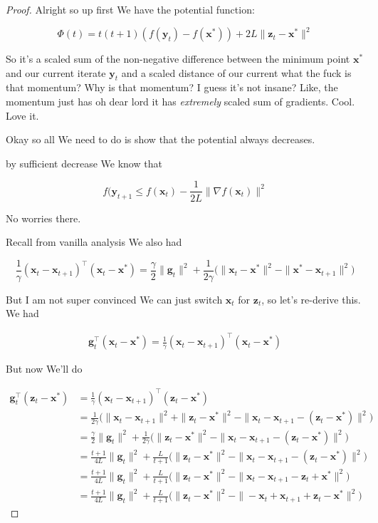 \documentclass{article}
\begin{document}
		\begin{proof}
			Alright so up first We have the potential function:
			
			\[ \Phi(t) = t(t+1)(f(\mathbf{y}_t) - f(\mathbf{x}^*)) + 2L \| \mathbf{z}_t - \mathbf{x}^* \|^2\]
		
		
		So it's a scaled sum of the non-negative difference between the minimum point $\mathbf{x}^*$ and our current iterate $\mathbf{y}_t$ and a scaled distance of our current what the fuck is that momentum? Why is that momentum?  I guess it's not insane? Like, the momentum just has oh dear lord it has \textit{extremely} scaled sum of gradients. Cool. Love it.
		
		Okay so all We need to do is show that the potential always decreases.
		
		by sufficient decrease We know that
		
		\[ f(\mathbf{y}_{t+1} \le f(\mathbf{x}_t) - \frac{1}{2L} \|\nabla f(\mathbf{x}_t) \|^2 \]
		
		No worries there.
		
		Recall from vanilla analysis We also had
		
		\[ \frac{1}{\gamma}(\mathbf{x}_t - \mathbf{x}_{t+1})^\top (\mathbf{x}_t - \mathbf{x}^*) =  \frac{\gamma}{2} \|\mathbf{g}_t\|^2 + \frac{1}{2\gamma}\big( \|\mathbf{x}_t - \mathbf{x}^*\|^2 - \| \mathbf{x}^* - \mathbf{x}_{t+1} \|^2 \big)\]
		
		But I am not super convinced We can just switch $\mathbf{x}_t$ for $\mathbf{z}_t$, so let's re-derive this. We had 
		
		\begin{align*}
			\mathbf{g}_t^\top (\mathbf{x}_t-\mathbf{x}^*) = \frac{1}{\gamma}(\mathbf{x}_t - \mathbf{x}_{t+1})^\top (\mathbf{x}_t - \mathbf{x}^*)
		\end{align*}

		But now We'll do

		\begin{align*}
			\mathbf{g}_t^\top (\mathbf{z}_t-\mathbf{x}^*) &= \frac{1}{\gamma}(\mathbf{x}_t - \mathbf{x}_{t+1})^\top (\mathbf{z}_t - \mathbf{x}^*)\\
			&= \frac{1}{2\gamma}\big( \|\mathbf{x}_t - \mathbf{x}_{t+1}\|^2 + \|\mathbf{z}_t - \mathbf{x}^*\|^2 - \| \mathbf{x}_t - \mathbf{x}_{t+1} - (\mathbf{z}_t - \mathbf{x}^*)  \|^2 \big)\\
			&= \frac{\gamma}{2} \|\mathbf{g}_t\|^2 + \frac{1}{2\gamma}\big(\|\mathbf{z}_t - \mathbf{x}^*\|^2 - \| \mathbf{x}_t - \mathbf{x}_{t+1} - (\mathbf{z}_t - \mathbf{x}^*)  \|^2 \big)\\
			&=\frac{t+1}{4L} \|\mathbf{g}_t\|^2 + \frac{L}{t+1}\big(\|\mathbf{z}_t - \mathbf{x}^*\|^2 - \| \mathbf{x}_t - \mathbf{x}_{t+1} - (\mathbf{z}_t - \mathbf{x}^*)  \|^2 \big)\\
			&=\frac{t+1}{4L} \|\mathbf{g}_t\|^2 + \frac{L}{t+1}\big(\|\mathbf{z}_t - \mathbf{x}^*\|^2 - \| \mathbf{x}_t - \mathbf{x}_{t+1} - \mathbf{z}_t + \mathbf{x}^*  \|^2 \big)\\
			&=\frac{t+1}{4L} \|\mathbf{g}_t\|^2 + \frac{L}{t+1}\big(\|\mathbf{z}_t - \mathbf{x}^*\|^2 - \| -\mathbf{x}_t + \mathbf{x}_{t+1} + \mathbf{z}_t - \mathbf{x}^*  \|^2 \big)
		\end{align*}
		

\end{proof}
\end{document}
